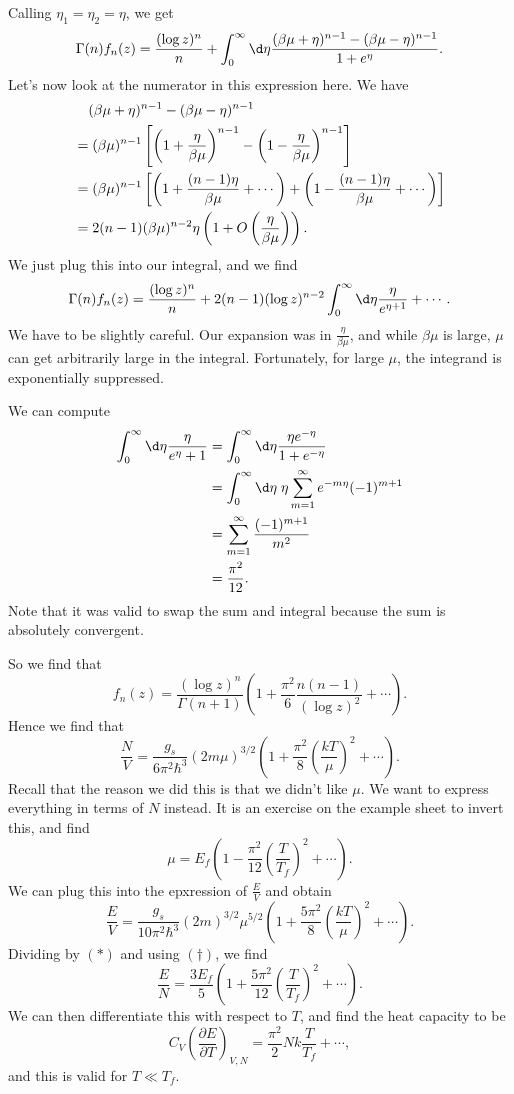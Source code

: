 \documentclass[a4paper]{article}
\begin{document}
Calling $\eta_1 = \eta_2 = \eta$, we get
\[
  \Gamma(n) f_n(z) = \frac{(\log z)^n}{n} + \int_0^\infty \d \eta \frac{(\beta \mu + \eta)^{n - 1} - (\beta \mu - \eta)^{n - 1}}{1 + e^\eta}.
\]
Let's now look at the numerator in this expression here. We have
\begin{align*}
  &\hphantom{={}}(\beta \mu + \eta)^{n - 1} - (\beta \mu - \eta)^{n - 1} \\
  &= (\beta\mu)^{n - 1}\left[\left(1 + \frac{\eta}{\beta\mu}\right)^{n - 1} - \left(1 - \frac{\eta}{\beta\mu}\right)^{n -1 }\right]\\
  &= (\beta \mu)^{n - 1}\left[\left(1 + \frac{(n - 1) \eta}{\beta\mu} + \cdots\right) + \left(1 - \frac{(n - 1)\eta}{\beta \mu} + \cdots\right)\right]\\
  &= 2(n - 1) (\beta\mu)^{n - 2} \eta \left(1 + O\left(\frac{\eta}{\beta\mu}\right)\right).
\end{align*}
We just plug this into our integral, and we find
\[
  \Gamma(n) f_n(z) = \frac{(\log z)^n}{n} + 2(n - 1) (\log z)^{n - 2}\int_0^\infty \d \eta \frac{\eta}{e^{\eta + 1}} + \cdots.
\]
We have to be slightly careful. Our expansion was in $\frac{\eta}{\beta\mu}$, and while $\beta\mu$ is large, $\mu$ can get arbitrarily large in the integral. Fortunately, for large $\mu$, the integrand is exponentially suppressed.

We can compute
\begin{align*}
  \int_0^\infty \d \eta \frac{\eta}{e^{\eta} + 1} &= \int_0^\infty \d \eta \frac{\eta e^{-\eta}}{1 + e^{-\eta}} \\
  &= \int_0^\infty \d \eta\; \eta \sum_{m = 1}^\infty e^{-m\eta}(-1)^{m + 1}\\
  &= \sum_{m = 1}^\infty \frac{(-1)^{m + 1}}{m^2}\\
  &= \frac{\pi^2}{12}.
\end{align*}
Note that it was valid to swap the sum and integral because the sum is absolutely convergent.

So we find that
\[
  f_n(z) = \frac{(\log z)^n}{\Gamma(n + 1)} \left(1 + \frac{\pi^2}{6}\frac{n(n - 1)}{(\log z)^2} + \cdots\right).
\]
Hence we find that
\[
  \frac{N}{V} = \frac{g_s}{6\pi^2 \hbar^3} (2m\mu)^{3/2} \left(1 + \frac{\pi^2}{8}\left(\frac{kT}{\mu}\right)^2 + \cdots\right).\tag{$*$}
\]
Recall that the reason we did this is that we didn't like $\mu$. We want to express everything in terms of $N$ instead. It is an exercise on the example sheet to invert this, and find
\[
  \mu = E_f \left(1 - \frac{\pi^2}{12} \left(\frac{T}{T_f}\right)^2 + \cdots\right).\tag{$\dagger$}
\]
We can plug this into the epxression of $\frac{E}{V}$ and obtain
\[
  \frac{E}{V} = \frac{g_s}{10 \pi^2 \hbar^3} (2m)^{3/2} \mu^{5/2} \left(1 + \frac{5 \pi^2}{8} \left(\frac{kT}{\mu}\right)^2 + \cdots\right).
\]
Dividing by $(*)$ and using $(\dagger)$, we find
\[
  \frac{E}{N} = \frac{3 E_f}{5} \left(1 + \frac{5 \pi^2}{12}\left(\frac{T}{T_f}\right)^2 + \cdots\right).
\]
We can then differentiate this with respect to $T$, and find the heat capacity to be
\[
  C_V \left(\frac{\partial E}{\partial T}\right)_{V, N} = \frac{\pi^2}{2} Nk\frac{T}{T_f} + \cdots,
\]
and this is valid for $T \ll T_f$.
\end{document}
